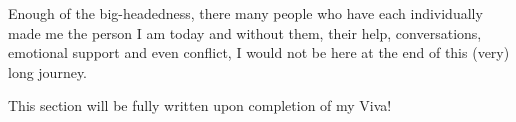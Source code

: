 Enough of the big-headedness, there many people who have each individually made me the person I am today and without them, their help, conversations, emotional support and even conflict, I would not be here at the end of this (very) long journey.

This section will be fully written upon completion of my Viva!

